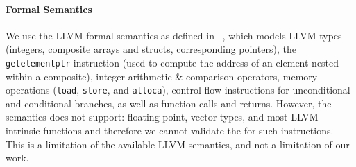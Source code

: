 \paragraph{\LLVM Formal Semantics} We use the LLVM formal semantics as defined
in \K~\cite{LLVMSEMA}, which models LLVM types (integers, composite arrays and
structs, corresponding pointers), the \texttt{getelementptr} instruction (used
to compute the address of an element nested within a composite),  integer
arithmetic \& comparison operators, memory operations (\texttt{load},
\texttt{store}, and \texttt{alloca}), control flow instructions for
unconditional and conditional branches, as well as function calls and returns.
However, the semantics does not support: floating point, vector types, and
most LLVM intrinsic functions and therefore we cannot validate the \tv for
such instructions.  This is a limitation of the available LLVM semantics, and
not a limitation of our work.

